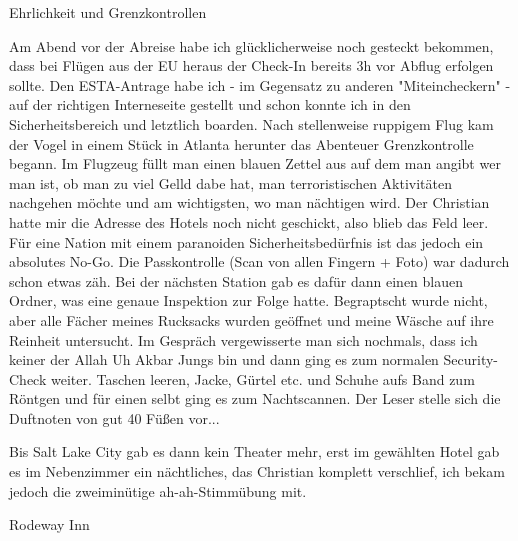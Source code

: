 Ehrlichkeit und Grenzkontrollen

Am Abend vor der Abreise habe ich glücklicherweise noch gesteckt bekommen, dass bei Flügen aus der EU heraus der Check-In bereits 3h vor Abflug erfolgen sollte.
Den ESTA-Antrage habe ich - im Gegensatz zu anderen "Miteincheckern" - auf der richtigen Interneseite gestellt und schon konnte ich in den Sicherheitsbereich und letztlich boarden.
Nach stellenweise ruppigem Flug kam der Vogel in einem Stück in Atlanta herunter das Abenteuer Grenzkontrolle begann.
Im Flugzeug füllt man einen blauen Zettel aus auf dem man angibt wer man ist, ob man zu viel Gelld dabe hat, man terroristischen Aktivitäten nachgehen möchte und am wichtigsten, wo man nächtigen wird.
Der Christian hatte mir die Adresse des Hotels noch nicht geschickt, also blieb das Feld leer.
Für eine Nation mit einem paranoiden Sicherheitsbedürfnis ist das jedoch ein absolutes No-Go.
Die Passkontrolle (Scan von allen Fingern + Foto) war dadurch schon etwas zäh.
Bei der nächsten Station gab es dafür dann einen blauen Ordner, was eine genaue Inspektion zur Folge hatte.
Begraptscht wurde nicht, aber alle Fächer meines Rucksacks wurden geöffnet und meine Wäsche auf ihre Reinheit untersucht.
Im Gespräch vergewisserte man sich nochmals, dass ich keiner der Allah Uh Akbar Jungs bin und dann ging es zum normalen Security-Check weiter.
Taschen leeren, Jacke, Gürtel etc. und Schuhe aufs Band zum Röntgen und für einen selbt ging es zum Nachtscannen.
Der Leser stelle sich die Duftnoten von gut 40 Füßen vor...

Bis Salt Lake City gab es dann kein Theater mehr, erst im gewählten Hotel gab es im Nebenzimmer ein nächtliches, das Christian komplett verschlief, ich bekam jedoch die zweiminütige ah-ah-Stimmübung mit.

Rodeway Inn
